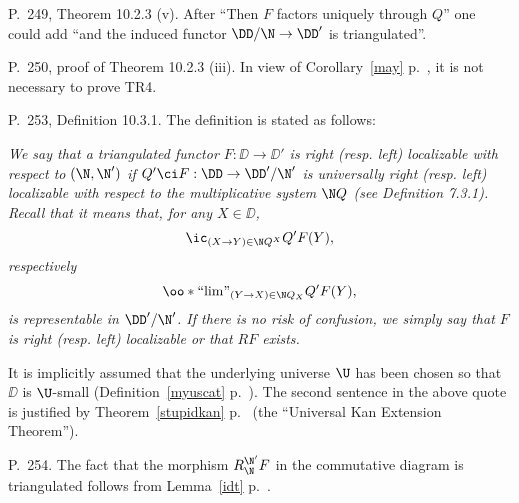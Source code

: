\documentclass[12pt]{article}
\theoremstyle{remark}
\theoremstyle{definition}
\begin{document}
\begin{s} 
P.~249, Theorem 10.2.3 (v). After ``Then $F$ factors uniquely through $Q$'' one could add ``and the induced functor $\DD/\N\to\DD'$ is triangulated''.
\end{s}


\begin{s} 
P.~250, proof of Theorem 10.2.3 (iii). In view of Corollary~\ref{may} p.~, it is not necessary to prove TR4.
\end{s}




\begin{s}
P.~253, Definition 10.3.1. The definition is stated as follows: 

\emph{We say that a triangulated functor $F:\DD\to\DD'$ is right (resp. left) localizable with respect to $(\N,\N')$ if $Q'\ci F:\DD\to\DD'/\N'$ is universally right (resp. left) localizable with respect to the multiplicative system $\N Q$ (see Definition 7.3.1). Recall that it means that, for any $X\in\DD$, 
$$
\ic_{(X\to Y)\in\N Q^X}Q'F(Y),
$$ 
respectively 
$$
\oo*{``\!\lim\!"}_{(Y\to X)\in\N Q_X}Q'F(Y),
$$ 
is representable in $\DD'/\N'$. If there is no risk of confusion, we simply say that $F$ is right (resp. left) localizable or that $RF$ exists.}

It is implicitly assumed that the underlying universe $\U$ has been chosen so that $\DD$ is $\U$-small (Definition~\ref{myuscat} p.~). The second sentence in the above quote is justified by Theorem~\ref{stupidkan} p.~ (the ``Universal Kan Extension Theorem''). 
\end{s}

%

\begin{s}
P.~254. The fact that the morphism $R^{\N'}_\N F$ in the commutative diagram is triangulated follows from Lemma~\ref{idt} p.~.
\end{s}
\end{document}
